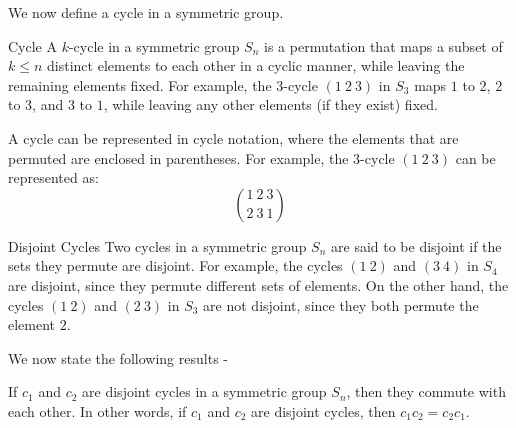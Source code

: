 \documentclass[openany]{book}
\begin{document}
We now define a cycle in a symmetric group.
\begin{mydefinition}{Cycle}
    A $k$-cycle in a symmetric group \( S_n \) is a permutation that maps a subset of \( k \leq n \) distinct elements to each other in a cyclic manner, while leaving the remaining elements fixed. For example, the 3-cycle \( (1\ 2\ 3) \) in \( S_3 \) maps \( 1 \) to \( 2 \), \( 2 \) to \( 3 \), and \( 3 \) to \( 1 \), while leaving any other elements (if they exist) fixed.
\end{mydefinition}
A cycle can be represented in cycle notation, where the elements that are permuted are enclosed in parentheses. For example, the 3-cycle \( (1\ 2\ 3) \) can be represented as:
$${1\ 2\ 3} \choose {2\ 3\ 1}$$
\begin{mydefinition}{Disjoint Cycles}
    Two cycles in a symmetric group \( S_n \) are said to be disjoint if the sets they permute are disjoint. For example, the cycles \( (1\ 2) \) and \( (3\ 4) \) in \( S_4 \) are disjoint, since they permute different sets of elements. On the other hand, the cycles \( (1\ 2) \) and \( (2\ 3) \) in \( S_3 \) are not disjoint, since they both permute the element \( 2 \).
\end{mydefinition}
We now state the following results - 
\begin{mytheorem}
    If \( c_1 \) and \( c_2 \) are disjoint cycles in a symmetric group \( S_n \), then they commute with each other. In other words, if \( c_1 \) and \( c_2 \) are disjoint cycles, then \( c_1 c_2 = c_2 c_1 \).
\end{mytheorem}
\end{document}
